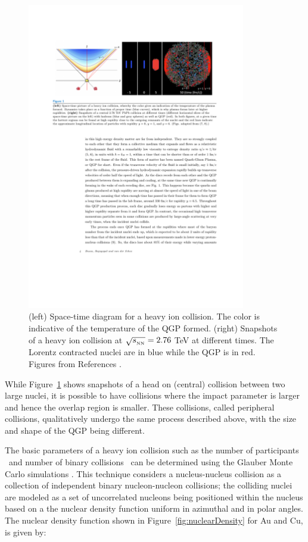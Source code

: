 \begin{figure}[htbp]
\begin{center}
\includegraphics[width=0.85\textwidth]{figures/theory/qgp_formation}
\caption{(left) Space-time diagram for a heavy ion collision. The color is indicative of the temperature of the QGP formed. (right) Snapshots of a heavy ion collision at $\mbox{$\sqrt{s_{_\text{NN}}}$} = 2.76$ TeV at different times. The Lorentz contracted nuclei are in blue while the QGP is in red. Figures from References \cite{7, 8}.  }
\label{fig:qgp_form}
\end{center}
\end{figure}

While Figure~\ref{fig:qgp_form} shows snapshots of a head on (central) collision between two large nuclei, it is possible to have collisions where the impact parameter is larger and hence the overlap region is smaller. These collisions, called peripheral collisions, qualitatively undergo the same process described above, with the size and shape of the QGP being different.

The basic parameters of a heavy ion collision such as the number of participants \Npart\ and number of binary collisions \Ncoll\ can be determined using the Glauber Monte Carlo simulations \cite{glauberArticle, glauberMisc}. This technique considers a nucleus-nucleus collision as a collection of independent binary nucleon-nucleon collisions; the colliding nuclei are modeled as a set of uncorrelated nucleons being positioned within the nucleus based on a the nuclear density function uniform in azimuthal and in polar angles. The nuclear density function shown in Figure~\ref{fig:nuclearDensity} for Au and Cu, is given by:

